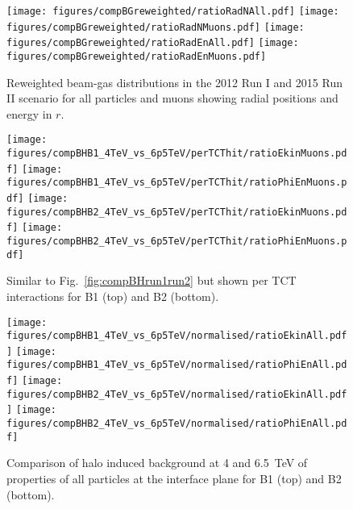 \begin{figure}%
\centering
\texttt{[image: figures/compBGreweighted/ratioRadNAll.pdf]}
\texttt{[image: figures/compBGreweighted/ratioRadNMuons.pdf]}
\texttt{[image: figures/compBGreweighted/ratioRadEnAll.pdf]}
\texttt{[image: figures/compBGreweighted/ratioRadEnMuons.pdf]}
\caption{Reweighted beam-gas distributions in the 2012 Run I and 2015 Run II scenario for all particles and muons showing radial positions and energy in $r$.
  \label{fig:compBGreweighted2}}
\end{figure}



\begin{figure}
  \begin{center}
  \texttt{[image: figures/compBHB1\_4TeV\_vs\_6p5TeV/perTCThit/ratioEkinMuons.pdf]}
  \texttt{[image: figures/compBHB1\_4TeV\_vs\_6p5TeV/perTCThit/ratioPhiEnMuons.pdf]}
  \texttt{[image: figures/compBHB2\_4TeV\_vs\_6p5TeV/perTCThit/ratioEkinMuons.pdf]}
  \texttt{[image: figures/compBHB2\_4TeV\_vs\_6p5TeV/perTCThit/ratioPhiEnMuons.pdf]}
\end{center}
\vspace{-0.6cm}
 \caption{Similar to Fig.~\ref{fig:compBHrun1run2} but shown per TCT interactions for B1 (top) and B2 (bottom).
  \label{fig:compBHrun1run2PerTCT}}
\end{figure}



\begin{figure}%
\begin{center}
  \texttt{[image: figures/compBHB1\_4TeV\_vs\_6p5TeV/normalised/ratioEkinAll.pdf]}
  \texttt{[image: figures/compBHB1\_4TeV\_vs\_6p5TeV/normalised/ratioPhiEnAll.pdf]}
  \texttt{[image: figures/compBHB2\_4TeV\_vs\_6p5TeV/normalised/ratioEkinAll.pdf]}
  \texttt{[image: figures/compBHB2\_4TeV\_vs\_6p5TeV/normalised/ratioPhiEnAll.pdf]}
\end{center}
\vspace{-0.6cm}
 \caption{Comparison of halo induced background at 4 and 6.5~TeV of properties of all particles at the interface plane for B1 (top) and B2 (bottom).
  \label{compBHrun1run22}}
\end{figure}



